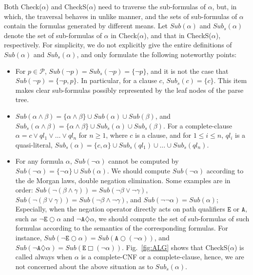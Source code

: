 \documentclass{entcs}
\begin{document}
Both Check($\alpha$) and CheckS($\alpha$) need to traverse the
sub-formulas of $\alpha$, but, in which, the traversal behaves in
unlike manner, and the sets of sub-formulas of $\alpha$ contain
the formulas generated by different means. Let $Sub(\alpha)$ and
$Sub_s(\alpha)$ denote the set of sub-formulas of $\alpha$ in
Check($\alpha$), and that in CheckS($\alpha$), respectively. For
simplicity, we do not explicitly give the entire definitions of
$Sub(\alpha)$ and $Sub_s(\alpha)$, and only formulate the
following noteworthy points:
\begin{itemize}
\small \item For $p\in\mathcal{P}$, $Sub(\neg p)=Sub_s(\neg
p)=\{\neg p\}$, and it is not the case that $Sub(\neg p)=\{\neg
p,p\}$. In particular, for a clause $c$, $Sub_s(c)=\{c\}$. This
item makes clear sub-formulas possibly represented by the leaf
nodes of the parse tree.

\item $Sub(\alpha\wedge\beta)=\{\alpha\wedge\beta\}\cup
Sub(\alpha)\cup Sub(\beta)$, and
$Sub_s(\alpha\wedge\beta)=\{\alpha\wedge\beta\}\cup
Sub_s(\alpha)\cup Sub_s(\beta)$. For a complete-clause
$\alpha=c\vee ql_1\vee\ldots\vee ql_n $ for $n\geq 1$, where $c$
is a clause, and for $1\leq i\leq n$, $ql_i$ is a quasi-literal,
$Sub_s(\alpha)=\{c,\alpha\}\cup Sub_s(ql_1)\cup\ldots\cup
Sub_s(ql_n)$.

\item For any formula $\alpha$, $Sub(\neg\alpha)$ cannot be
computed  by $Sub(\neg\alpha)=\{\neg\alpha\}\cup Sub(\alpha)$. We
should compute $Sub(\neg\alpha)$ according to the de Morgan laws,
double negation elimination. Some examples are in order:
$Sub(\neg(\beta\wedge\gamma))=Sub(\neg\beta\vee\neg\gamma)$,
$Sub(\neg(\beta\vee\gamma))=Sub(\neg\beta\wedge\neg\gamma)$, and
$Sub(\neg\neg\alpha)=Sub(\alpha)$; Especially, when the negation
operator directly acts on path qualifiers $\texttt{E}$ or
$\texttt{A}$, such as $\neg\texttt{E}\bigcirc\alpha$ and
$\neg\texttt{A}\diamondsuit\alpha$, we should compute the set of
sub-formulas of such formulas according to the semantics of the
corresponding formulas. For instance,
$Sub(\neg\texttt{E}\bigcirc\alpha)=Sub(\texttt{A}\bigcirc(\neg\alpha))$,
and
$Sub(\neg\texttt{A}\diamondsuit\alpha)=Sub(\texttt{E}\Box(\neg\alpha))$.
Fig.~\ref{fig:ALG} shows that CheckS($\alpha$) is called always
when $\alpha$ is a complete-CNF or a complete-clause, hence, we
are not concerned about the above situation as to $Sub_s(\alpha)$.



\end{itemize}
\end{document}
